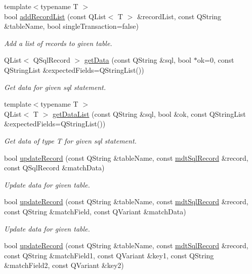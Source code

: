 \begin{DoxyCompactItemize}
{\footnotesize template$<$typename T $>$ }\\bool \hyperlink{classmdt_tt_base_a2834f11dad159644fa47287cf9eb5952}{add\-Record\-List} (const Q\-List$<$ T $>$ \&record\-List, const Q\-String \&table\-Name, bool single\-Transaction=false)
\begin{DoxyCompactList}\small\item\em Add a list of records to given table. \end{DoxyCompactList}\item 
Q\-List$<$ Q\-Sql\-Record $>$ \hyperlink{classmdt_tt_base_aac6b0c135d2ff61d23ee9b37525a8ad5}{get\-Data} (const Q\-String \&sql, bool $\ast$ok=0, const Q\-String\-List \&expected\-Fields=Q\-String\-List())
\begin{DoxyCompactList}\small\item\em Get data for given sql statement. \end{DoxyCompactList}\item 
{\footnotesize template$<$typename T $>$ }\\Q\-List$<$ T $>$ \hyperlink{classmdt_tt_base_a6c0834b21432a734c6ebfb645f290716}{get\-Data\-List} (const Q\-String \&sql, bool \&ok, const Q\-String\-List \&expected\-Fields=Q\-String\-List())
\begin{DoxyCompactList}\small\item\em Get data of type T for given sql statement. \end{DoxyCompactList}\item 
bool \hyperlink{classmdt_tt_base_a40a9416a29d96518f39b2225516a2786}{update\-Record} (const Q\-String \&table\-Name, const \hyperlink{classmdt_sql_record}{mdt\-Sql\-Record} \&record, const Q\-Sql\-Record \&match\-Data)
\begin{DoxyCompactList}\small\item\em Update data for given table. \end{DoxyCompactList}\item 
bool \hyperlink{classmdt_tt_base_a884be1a05bf38121afda06758ff6ac41}{update\-Record} (const Q\-String \&table\-Name, const \hyperlink{classmdt_sql_record}{mdt\-Sql\-Record} \&record, const Q\-String \&match\-Field, const Q\-Variant \&match\-Data)
\begin{DoxyCompactList}\small\item\em Update data for given table. \end{DoxyCompactList}\item 
bool \hyperlink{classmdt_tt_base_a07813d5d22efacfcbb044ee6d0023785}{update\-Record} (const Q\-String \&table\-Name, const \hyperlink{classmdt_sql_record}{mdt\-Sql\-Record} \&record, const Q\-String \&match\-Field1, const Q\-Variant \&key1, const Q\-String \&match\-Field2, const Q\-Variant \&key2)

\end{DoxyCompactItemize}
